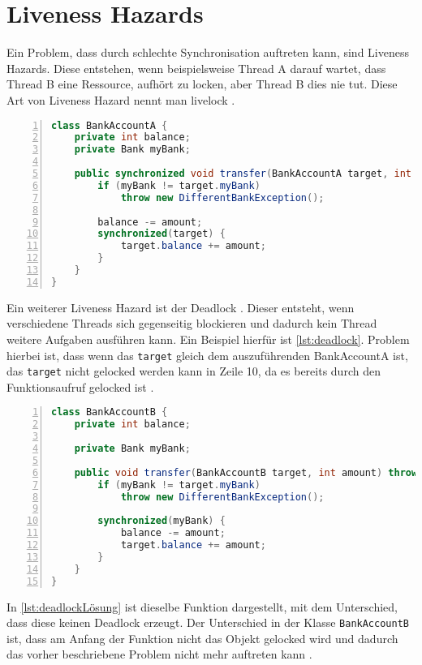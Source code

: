 \section{Liveness Hazards}

Ein Problem, dass durch schlechte Synchronisation auftreten kann, sind Liveness Hazards. Diese entstehen, wenn beispielsweise Thread A darauf wartet, dass Thread B eine Ressource, aufhört zu locken, aber Thread B dies nie tut. Diese Art von Liveness Hazard nennt man livelock \cite[vgl.][5-6]{brian}.

\begin{lstlisting}[language=Java,frame=tb,caption={Deadlock \cite{fekete_teaching_nodate}}, label={lst:deadlock}, numbers=left, stepnumber=1, captionpos=b, tabsize=4]
class BankAccountA {
    private int balance; 
    private Bank myBank; 

    public synchronized void transfer(BankAccountA target, int amount) throws DifferentBankException {
        if (myBank != target.myBank) 
            throw new DifferentBankException(); 
        
        balance -= amount; 
        synchronized(target) { 
            target.balance += amount; 
        } 
    }
}
\end{lstlisting}

Ein weiterer Liveness Hazard ist der Deadlock \cite[vgl.][6]{brian}. Dieser entsteht, wenn verschiedene Threads sich gegenseitig blockieren und dadurch kein Thread weitere Aufgaben ausführen kann. Ein Beispiel hierfür ist \ref{lst:deadlock}. Problem hierbei ist, dass wenn das \texttt{target} gleich dem auszuführenden BankAccountA ist, das \texttt{target} nicht gelocked werden kann in Zeile 10, da es bereits durch den Funktionsaufruf gelocked ist \cite[vgl.][122]{fekete_teaching_nodate}. 
\\
\begin{lstlisting}[language=Java,frame=tb,caption={Deadlock Lösung \cite{fekete_teaching_nodate}}, label={lst:deadlockLösung}, numbers=left, stepnumber=1, captionpos=b, tabsize=4]
class BankAccountB { 
    private int balance; 
    
    private Bank myBank; 

    public void transfer(BankAccountB target, int amount) throws DifferentBankException { 
        if (myBank != target.myBank)
            throw new DifferentBankException(); 
        
        synchronized(myBank) { 
            balance -= amount; 
            target.balance += amount; 
        } 
    }
}
\end{lstlisting}

In \ref{lst:deadlockLösung} ist dieselbe Funktion dargestellt, mit dem Unterschied, dass diese keinen Deadlock erzeugt. Der Unterschied in der Klasse \texttt{BankAccountB} ist, dass am Anfang der Funktion nicht das Objekt gelocked wird und dadurch das vorher beschriebene Problem nicht mehr auftreten kann \cite[vgl.][122]{fekete_teaching_nodate}.